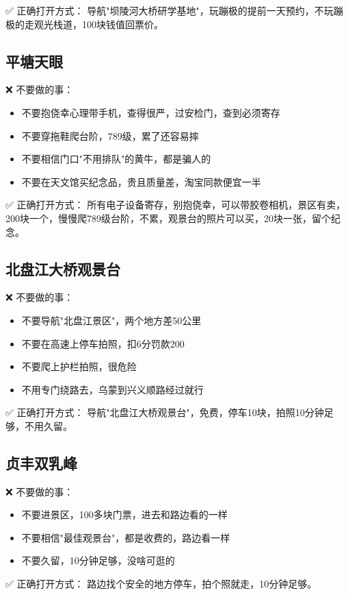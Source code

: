 \documentclass[12pt,a4paper,UTF8]{ctexart}
\begin{document}
✅ 正确打开方式：
导航"坝陵河大桥研学基地"，玩蹦极的提前一天预约，不玩蹦极的走观光栈道，100块钱值回票价。

\subsection{平塘天眼}
❌ 不要做的事：
\begin{itemize}
\item 不要抱侥幸心理带手机，查得很严，过安检门，查到必须寄存
\item 不要穿拖鞋爬台阶，789级，累了还容易摔
\item 不要相信门口"不用排队"的黄牛，都是骗人的
\item 不要在天文馆买纪念品，贵且质量差，淘宝同款便宜一半
\end{itemize}

✅ 正确打开方式：
所有电子设备寄存，别抱侥幸，可以带胶卷相机，景区有卖，200块一个，慢慢爬789级台阶，不累，观景台的照片可以买，20块一张，留个纪念。

\subsection{北盘江大桥观景台}
❌ 不要做的事：
\begin{itemize}
\item 不要导航"北盘江景区"，两个地方差50公里
\item 不要在高速上停车拍照，扣6分罚款200
\item 不要爬上护栏拍照，很危险
\item 不用专门绕路去，乌蒙到兴义顺路经过就行
\end{itemize}

✅ 正确打开方式：
导航"北盘江大桥观景台"，免费，停车10块，拍照10分钟足够，不用久留。

\subsection{贞丰双乳峰}
❌ 不要做的事：
\begin{itemize}
\item 不要进景区，100多块门票，进去和路边看的一样
\item 不要相信"最佳观景台"，都是收费的，路边看一样
\item 不要久留，10分钟足够，没啥可逛的
\end{itemize}

✅ 正确打开方式：
路边找个安全的地方停车，拍个照就走，10分钟足够。
\end{document}
